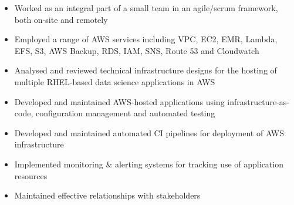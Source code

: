 \documentclass[6pt,a4paper,ragged2e,withhyper]{altacv}
\begin{document}


  \makecvheader


  \begin{paracol}{2}



    \begin{itemize}
      \item Worked as an integral part of a small team in an agile/scrum framework, both on-site and remotely
      \item Employed a range of AWS services including VPC, EC2, EMR, Lambda, EFS, S3, AWS Backup, RDS, IAM, SNS, Route 53 and Cloudwatch
      \item Analysed and reviewed technical infrastructure designs for the hosting of multiple RHEL-based data science applications in AWS
      \item Developed and maintained AWS-hosted applications using infrastructure-as-code, configuration management and automated testing
      \item Developed and maintained automated CI pipelines for deployment of AWS infrastructure
      \item Implemented monitoring \& alerting systems for tracking use of application resources
      \item Maintained effective relationships with stakeholders
    \end{itemize}

    \vspace{-0.3cm}\divider


    \vspace{-0.3cm}\divider


    \vspace{-0.3cm}\divider


\end{paracol}
\end{document}
